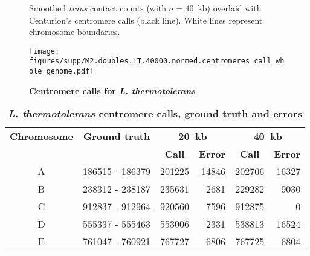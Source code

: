 \clearpage


\begin{figure}[ht!]
\caption{\textbf{Centromere calls for \textit{L. thermotolerans}}}{
Smoothed \textit{trans} contact counts (with $\sigma=40$~kb) overlaid with
Centurion's centromere calls (black line). White lines represent chromosome
boundaries.
}

\begin{center}
\texttt{[image: figures/supp/M2.doubles.LT.40000.normed.centromeres\_call\_whole\_genome.pdf]}
\end{center}
\label{suppfig:LT_calls}
\end{figure}


\begin{table}[ht!]
\caption{\textbf{\textit{L. thermotolerans} centromere calls, ground truth and errors}}
\begin{center}
\begin{tabular}{c | c  r  r  r  r}
\textbf{Chromosome}  & \textbf{Ground truth} & \multicolumn{2}{c}{\textbf{20~kb}} & \multicolumn{2}{c}{\textbf{40~kb}} \\
  &   &  \multicolumn{1}{c}{\textbf{Call}} &  \multicolumn{1}{c}{\textbf{Error}} &  \multicolumn{1}{c}{\textbf{Call}} &  \multicolumn{1}{c}{\textbf{Error}} \\
\hline
A & \num[group-separator={\,}]{186515} - \num[group-separator={\,}]{186379} & \num[group-separator={\,}]{201225} & \small{\num[group-separator={\,}]{14846}}  & \num[group-separator={\,}]{202706} & \small{\num[group-separator={\,}]{16327}}  \\
B & \num[group-separator={\,}]{238312} - \num[group-separator={\,}]{238187} & \num[group-separator={\,}]{235631} & \small{\num[group-separator={\,}]{2681}}  & \num[group-separator={\,}]{229282} & \small{\num[group-separator={\,}]{9030}}  \\
C & \num[group-separator={\,}]{912837} - \num[group-separator={\,}]{912964} & \num[group-separator={\,}]{920560} & \small{\num[group-separator={\,}]{7596}}  & \num[group-separator={\,}]{912875} & \small{\num[group-separator={\,}]{0}}  \\
D & \num[group-separator={\,}]{555337} - \num[group-separator={\,}]{555463} & \num[group-separator={\,}]{553006} & \small{\num[group-separator={\,}]{2331}}  & \num[group-separator={\,}]{538813} & \small{\num[group-separator={\,}]{16524}}  \\
E & \num[group-separator={\,}]{761047} - \num[group-separator={\,}]{760921} & \num[group-separator={\,}]{767727} & \small{\num[group-separator={\,}]{6806}}  & \num[group-separator={\,}]{767725} & \small{\num[group-separator={\,}]{6804}}  \\

\end{tabular}
\end{center}
\end{table}

